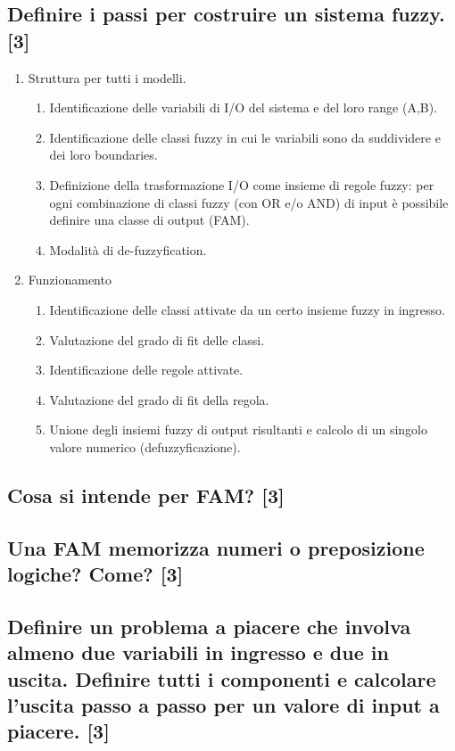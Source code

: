\documentclass[\main/main.tex]{subfiles}
\begin{document}
\subsection{Definire i passi per costruire un sistema fuzzy. [3]}
\begin{enumerate}
	\item Struttura per tutti i modelli.
	      \begin{enumerate}
		      \item Identificazione delle variabili di I/O del sistema e del loro range (A,B).
		      \item Identificazione delle classi fuzzy in cui le variabili sono da suddividere e dei loro boundaries.
		      \item Definizione della trasformazione I/O come insieme di regole fuzzy: per ogni combinazione di classi fuzzy (con OR e/o AND) di input è possibile definire una classe di output (FAM).
		      \item Modalità di de-fuzzyfication.
	      \end{enumerate}
	\item Funzionamento
	      \begin{enumerate}
		      \item Identificazione delle classi attivate da un certo insieme fuzzy in ingresso.
		      \item Valutazione del grado di fit delle classi.
		      \item Identificazione delle regole attivate.
		      \item Valutazione del grado di fit della regola.
		      \item Unione degli insiemi fuzzy di output risultanti e calcolo di un singolo valore numerico (defuzzyficazione).
	      \end{enumerate}
\end{enumerate}
\subsection{Cosa si intende per FAM? [3]}
\subsection{Una FAM memorizza numeri o preposizione logiche? Come? [3]}
\subsection{Definire un problema a piacere che involva almeno due variabili in ingresso e due in uscita. Definire tutti i componenti e calcolare l'uscita passo a passo per un valore di input a piacere. [3]}
\end{document}
